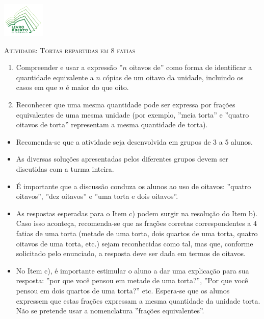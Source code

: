 \documentclass[10 pt,usenames,dvipsnames, oneside]{article}
\begin{document}
\begin{center}
  \begin{minipage}[l]{3cm}
\includegraphics[width=2cm]{logo}    
\end{minipage}\hfill
\begin{minipage}[r]{.8\textwidth}
 {\Large \scshape Atividade: Tortas repartidas em 8 fatias}  
\end{minipage}
\end{center}
\vspace{.2cm}

\ifdefined\prof
\begin{goals}
\begin{enumerate}

\item Compreender e usar a expressão ''$n$ oitavos de''{} como forma de identificar a quantidade equivalente a $n$ cópias de um oitavo da unidade, incluindo os casos em que $n$ é maior do que oito.
\item Reconhecer que uma mesma quantidade pode ser expressa por frações equivalentes de uma mesma unidade (por exemplo, ''meia torta''{} e ''quatro oitavos de torta'' representam a mesma quantidade de torta).

\end{enumerate}

\tcblower
\begin{multicols}{2}


\begin{itemize} %
    \item Recomenda-se que a atividade seja desenvolvida em grupos de 3 a 5 alunos.
    \item As diversas soluções apresentadas pelos diferentes grupos devem ser discutidas com a turma inteira.
    \item É importante que a discussão conduza os alunos ao uso de oitavos:  ''quatro oitavos'', ''dez oitavos''{} e ''uma torta e dois oitavos''.
     \item As respostas esperadas para o Item c) podem surgir na resolução do Item b). Caso isso aconteça, recomenda-se que as frações corretas correspondentes a $4$ fatias de uma torta (metade de uma torta, dois quartos de uma torta, quatro oitavos de uma torta, etc.) sejam reconhecidas como tal, mas que, conforme solicitado pelo enunciado, a resposta deve ser dada em termos de oitavos.
     \item No Item c), é importante estimular o aluno a dar uma explicação para sua resposta: ''por que você pensou em metade de uma torta?''{}, ''Por que você pensou em dois quartos de uma torta?''{} etc. Espera-se que os alunos expressem que estas frações expressam a mesma quantidade da unidade torta. Não se pretende usar a nomenclatura ''frações equivalentes''.
\end{itemize}

\end{multicols}
\end{goals}
\end{document}
